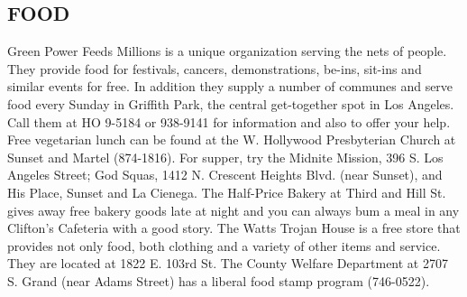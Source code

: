 \documentclass[11pt,twoside,a4paper]{book}
\begin{document}
\subsection{FOOD}
Green Power Feeds Millions is a unique organization serving the nets of people. They provide food for festivals, cancers, demonstrations, be-ins, sit-ins and similar events for free. In addition they supply a number of communes and serve food every Sunday in Griffith Park, the central get-together spot in Los Angeles. Call them at HO 9-5184 or 938-9141 for information and also to offer your help. Free vegetarian lunch can be found at the W. Hollywood Presbyterian Church at Sunset and Martel (874-1816). For supper, try the Midnite Mission, 396 S. Los Angeles Street; God Squas, 1412 N. Crescent Heights Blvd. (near Sunset), and His Place, Sunset and La Cienega. The Half-Price Bakery at Third and Hill St. gives away free bakery goods late at night and you can always bum a meal in any Clifton's Cafeteria with a good story. The Watts Trojan House is a free store that provides not only food, both clothing and a variety of other items and service. They are located at 1822 E. 103rd St. The County Welfare Department at 2707 S. Grand (near Adams Street) has a liberal food stamp program (746-0522).~\\
\end{document}
